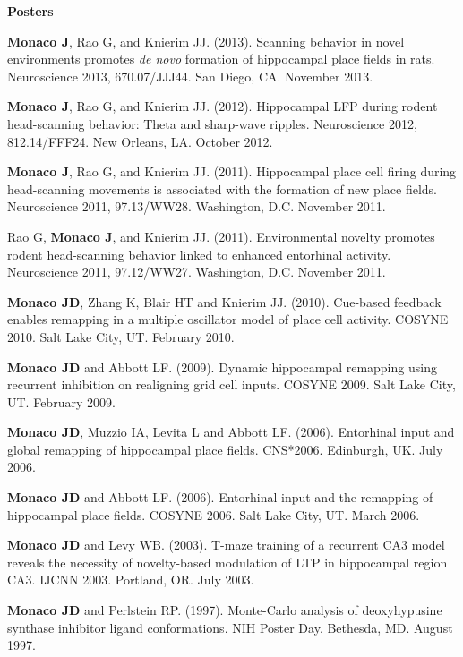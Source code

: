 \documentclass[10pt]{article}
\begin{document}
\begin{description}
\item \textbf{Posters}\nopagebreak
\item[\quad] \textbf{Monaco J}, Rao G, and Knierim JJ. (2013). Scanning behavior in novel environments promotes \emph{de novo} formation of hippocampal place fields in rats. Neuroscience 2013, 670.07/JJJ44. San Diego, CA. November 2013.
\item[\quad] \textbf{Monaco J}, Rao G, and Knierim JJ. (2012). Hippocampal LFP during rodent head-scanning behavior: Theta and sharp-wave ripples. Neuroscience 2012, 812.14/FFF24. New Orleans, LA. October 2012.
\item[\quad] \textbf{Monaco J}, Rao G, and Knierim JJ. (2011). Hippocampal place cell firing during head-scanning movements is associated with the formation of new place fields. Neuroscience 2011, 97.13/WW28. Washington, D.C. November 2011.
\item[\quad] Rao G, \textbf{Monaco J}, and Knierim JJ. (2011). Environmental novelty promotes rodent head-scanning behavior linked to enhanced entorhinal activity. Neuroscience 2011, 97.12/WW27. Washington, D.C. November 2011.
\item[\quad] \textbf{Monaco JD}, Zhang K, Blair HT and Knierim JJ. (2010). Cue-based feedback enables remapping in a multiple oscillator model of place cell activity. COSYNE 2010. Salt Lake City, UT. February 2010.
\item[\quad] \textbf{Monaco JD} and Abbott LF. (2009). Dynamic hippocampal remapping using recurrent inhibition on realigning grid cell inputs. COSYNE 2009. Salt Lake City, UT. February 2009.
\item[\quad] \textbf{Monaco JD}, Muzzio IA, Levita L and Abbott LF. (2006). Entorhinal input and global remapping of hippocampal place fields. CNS*2006. Edinburgh, UK. July 2006.
\item[\quad] \textbf{Monaco JD} and Abbott LF. (2006). Entorhinal input and the remapping of hippocampal place fields. COSYNE 2006. Salt Lake City, UT. March 2006.
\item[\quad] \textbf{Monaco JD} and Levy WB. (2003). T-maze training of a recurrent CA3 model reveals the necessity of novelty-based modulation of LTP in hippocampal region CA3. IJCNN 2003. Portland, OR. July 2003.
\item[\quad] \textbf{Monaco JD} and Perlstein RP. (1997). Monte-Carlo analysis of deoxyhypusine synthase inhibitor ligand conformations. NIH Poster Day. Bethesda, MD. August 1997. 
\end{description}
\end{document}
